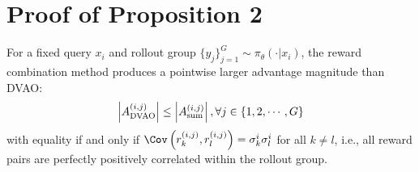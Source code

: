 \section{Proof of Proposition 2}
\label{appendix:proof_of_proposition_2}


\begin{proposition}
    For a fixed query $x_i$ and rollout group $\{y_j\}_{j=1}^G \sim \pi_\theta(\cdot | x_i)$, the reward combination method produces a pointwise larger advantage magnitude than DVAO:
    \begin{align}
        \left| A_\text{DVAO}^{(i,j)} \right| \le \left| A_\text{sum}^{(i,j)} \right|, \forall j \in \{1, 2, \cdots, G\} \notag
    \end{align}
    with equality if and only if $\Cov\left(r_k^{(i,j)}, r_l^{(i,j)}\right) = \sigma_k^i \sigma_l^i$ for all $k \neq l$, i.e., all reward pairs are perfectly positively correlated within the rollout group.
\end{proposition}

